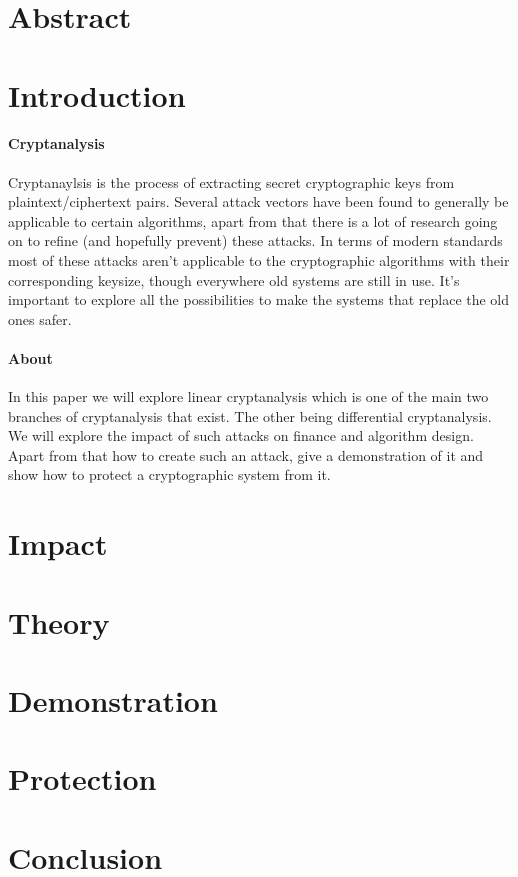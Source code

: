 \documentclass[11pt,a4paper]{article}
\begin{document}
\begin{titlepage}
    
\end{titlepage}
\newpage
\tableofcontents
\newpage
\begin{multicols}{2}
\section{Abstract}
\section{Introduction}
\paragraph{Cryptanalysis}
Cryptanaylsis is the process of extracting secret cryptographic keys from plaintext/ciphertext pairs. Several attack vectors have been found to generally be applicable to certain algorithms, apart from that there is a lot of research going on to refine (and hopefully prevent) these attacks. In terms of modern standards most of these attacks aren't applicable to the cryptographic algorithms with their corresponding keysize, though everywhere old systems are still in use. It's important to explore all the possibilities to make the systems that replace the old ones safer.
\paragraph{About}
In this paper we will explore linear cryptanalysis which is one of the main two branches of cryptanalysis that exist. The other being differential cryptanalysis. We will explore the impact of such attacks on finance and algorithm design. Apart from that how to create such an attack, give a demonstration of it and show how to protect a cryptographic system from it.
\end{multicols}
\section{Impact}
\section{Theory}
\section{Demonstration}
\section{Protection}
\section{Conclusion}
\end{document}
